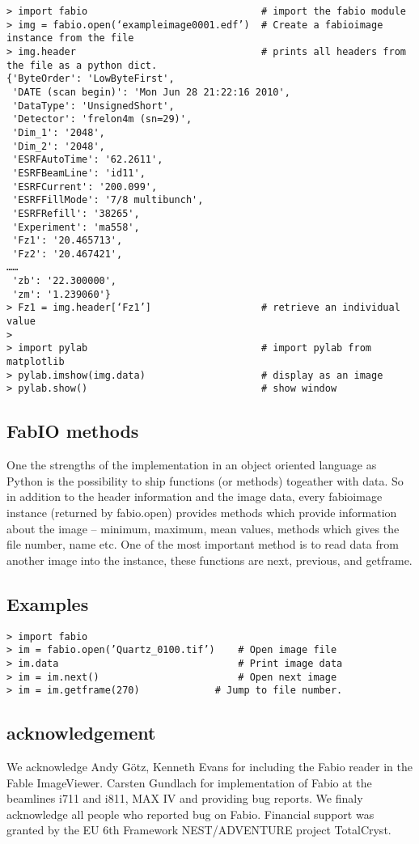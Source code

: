 \documentclass{iucr}
\begin{document}
\begin{verbatim}
> import fabio 								# import the fabio module 
> img = fabio.open(‘exampleimage0001.edf’) 	# Create a fabioimage instance from the file
> img.header 								# prints all headers from the file as a python dict. 
{'ByteOrder': 'LowByteFirst',
 'DATE (scan begin)': 'Mon Jun 28 21:22:16 2010',
 'DataType': 'UnsignedShort',
 'Detector': 'frelon4m (sn=29)',
 'Dim_1': '2048',
 'Dim_2': '2048',
 'ESRFAutoTime': '62.2611',
 'ESRFBeamLine': 'id11',
 'ESRFCurrent': '200.099',
 'ESRFFillMode': '7/8 multibunch',
 'ESRFRefill': '38265',
 'Experiment': 'ma558',
 'Fz1': '20.465713',
 'Fz2': '20.467421',
……
 'zb': '22.300000',
 'zm': '1.239060'}
> Fz1 = img.header[‘Fz1’]					# retrieve an individual value
>
> import pylab								# import pylab from matplotlib  
> pylab.imshow(img.data)					# display as an image
> pylab.show()								# show window
\end{verbatim}

\subsection{FabIO methods}

One the strengths of the implementation in an object oriented language as Python
is the possibility to ship functions (or methods) togeather with data. So in
addition to the header information and the image data, every fabioimage instance
(returned by fabio.open) provides methods which provide information about the image – minimum, maximum, mean values, 
methods which gives the file number, name etc. One of the most important method
is to read data from another image into the instance, these functions are next, previous, and getframe.
   

\subsection{Examples}
\begin{verbatim}
> import fabio 							
> im = fabio.open(’Quartz_0100.tif’)	# Open image file
> im.data								# Print image data								  
> im = im.next()						# Open next image
> im = im.getframe(270)				# Jump to file number.
\end{verbatim} 
\subsection{acknowledgement}
We acknowledge Andy G\"otz, Kenneth Evans for including the Fabio reader in the
Fable ImageViewer.  
Carsten Gundlach for implementation of Fabio at the beamlines i711 and i811, MAX IV and providing bug reports.
We finaly acknowledge all people who reported bug on Fabio. 
Financial support was granted by the EU 6th Framework NEST/ADVENTURE project
TotalCryst.



\end{document}

